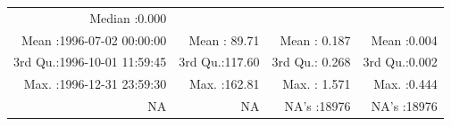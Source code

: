 \documentclass[
  10pt,
  a4paper,oneside]{article}
\begin{document}
\begin{longtable}[]{@{}rrrr@{}}
\begin{minipage}[t]{0.19\columnwidth}
Median :0.000\strut
\end{minipage}\tabularnewline
\begin{minipage}[t]{0.33\columnwidth}\raggedleft
Mean :1996-07-02 00:00:00\strut
\end{minipage} & \begin{minipage}[t]{0.19\columnwidth}\raggedleft
Mean : 89.71\strut
\end{minipage} & \begin{minipage}[t]{0.19\columnwidth}\raggedleft
Mean : 0.187\strut
\end{minipage} & \begin{minipage}[t]{0.19\columnwidth}\raggedleft
Mean :0.004\strut
\end{minipage}\tabularnewline
\begin{minipage}[t]{0.33\columnwidth}\raggedleft
3rd Qu.:1996-10-01 11:59:45\strut
\end{minipage} & \begin{minipage}[t]{0.19\columnwidth}\raggedleft
3rd Qu.:117.60\strut
\end{minipage} & \begin{minipage}[t]{0.19\columnwidth}\raggedleft
3rd Qu.: 0.268\strut
\end{minipage} & \begin{minipage}[t]{0.19\columnwidth}\raggedleft
3rd Qu.:0.002\strut
\end{minipage}\tabularnewline
\begin{minipage}[t]{0.33\columnwidth}\raggedleft
Max. :1996-12-31 23:59:30\strut
\end{minipage} & \begin{minipage}[t]{0.19\columnwidth}\raggedleft
Max. :162.81\strut
\end{minipage} & \begin{minipage}[t]{0.19\columnwidth}\raggedleft
Max. : 1.571\strut
\end{minipage} & \begin{minipage}[t]{0.19\columnwidth}\raggedleft
Max. :0.444\strut
\end{minipage}\tabularnewline
\begin{minipage}[t]{0.33\columnwidth}\raggedleft
NA\strut
\end{minipage} & \begin{minipage}[t]{0.19\columnwidth}\raggedleft
NA\strut
\end{minipage} & \begin{minipage}[t]{0.19\columnwidth}\raggedleft
NA's :18976\strut
\end{minipage} & \begin{minipage}[t]{0.19\columnwidth}\raggedleft
NA's :18976\strut
\end{minipage}\tabularnewline
\bottomrule
\end{longtable}
\end{document}
